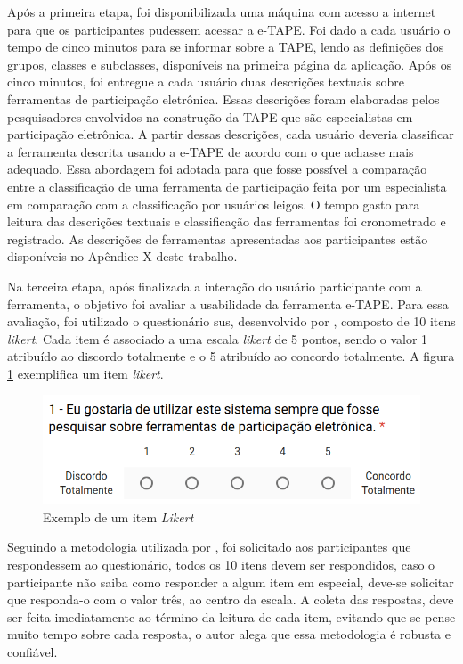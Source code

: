 \par
Após a primeira etapa, foi disponibilizada uma máquina com acesso a internet para que os participantes pudessem acessar a e-TAPE. Foi dado a cada usuário o tempo de cinco minutos para se informar sobre a TAPE, lendo as definições dos grupos, classes e subclasses,
disponíveis na primeira página da aplicação. 
Após os cinco minutos, foi entregue a cada usuário duas descrições textuais sobre ferramentas de participação eletrônica. Essas descrições foram elaboradas pelos pesquisadores envolvidos na construção da TAPE que são especialistas em participação eletrônica. 
A partir dessas descrições, cada usuário deveria classificar a ferramenta descrita usando a e-TAPE de acordo com o que achasse mais adequado.
Essa abordagem foi adotada para que fosse possível a comparação entre a classificação de uma ferramenta de participação feita por um especialista em comparação com a classificação por usuários leigos. O tempo gasto para leitura das descrições textuais e classificação das ferramentas foi cronometrado e registrado.
As descrições de ferramentas apresentadas aos participantes estão disponíveis no Apêndice X deste trabalho.

\par
Na terceira etapa, após finalizada a interação do usuário participante com a ferramenta, o objetivo foi avaliar a usabilidade da ferramenta e-TAPE.
Para essa avaliação, foi utilizado o questionário \acrfull{sus}, desenvolvido por , composto de 10 itens \textit{likert}. 
Cada item é associado a uma escala \textit{likert} de 5 pontos, sendo o valor 1 atribuído ao discordo totalmente e o  5 atribuído ao concordo totalmente.
A figura \ref{fig:exemplo-pergunta} exemplifica um item \textit{likert}.

\begin{figure}[!ht]
    \centering
    \includegraphics[scale=0.5]{./figuras/exemplo_pergunta.png}
    \caption{Exemplo de um item \textit{Likert}}
    \label{fig:exemplo-pergunta}
\end{figure}

\par
Seguindo a metodologia utilizada por , foi solicitado aos participantes que respondessem ao questionário, todos os 10 itens devem ser respondidos,
caso o participante não saiba como responder a algum item em especial, deve-se solicitar que responda-o com o valor três, ao centro da escala. A coleta das respostas, 
deve ser feita imediatamente ao término da leitura de cada item, evitando que se pense muito tempo sobre cada resposta, o autor alega que essa metodologia é robusta e confiável.

